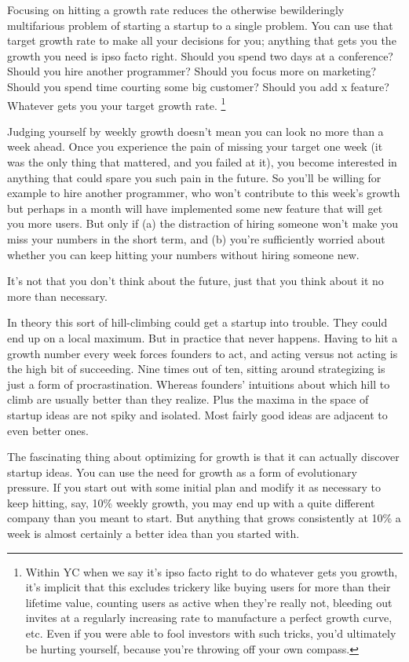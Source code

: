 \documentclass[12pt]{book}
\begin{document}
Focusing on hitting a growth rate reduces the otherwise bewilderingly
multifarious problem of starting a startup to a single problem. You can
use that target growth rate to make all your decisions for you; anything
that gets you the growth you need is ipso facto right. Should you spend
two days at a conference? Should you hire another programmer? Should you
focus more on marketing? Should you spend time courting some big
customer? Should you add x feature? Whatever gets you your target growth
rate. \footnote{Within YC when we say it's ipso facto right to do whatever gets
you growth, it's implicit that this excludes trickery like buying users
for more than their lifetime value, counting users as active when
they're really not, bleeding out invites at a regularly increasing rate
to manufacture a perfect growth curve, etc. Even if you were able to
fool investors with such tricks, you'd ultimately be hurting yourself,
because you're throwing off your own compass.}

Judging yourself by weekly growth doesn't mean you can look no more than
a week ahead. Once you experience the pain of missing your target one
week (it was the only thing that mattered, and you failed at it), you
become interested in anything that could spare you such pain in the
future. So you'll be willing for example to hire another programmer, who
won't contribute to this week's growth but perhaps in a month will have
implemented some new feature that will get you more users. But only if
(a) the distraction of hiring someone won't make you miss your numbers
in the short term, and (b) you're sufficiently worried about whether you
can keep hitting your numbers without hiring someone new.

It's not that you don't think about the future, just that you think
about it no more than necessary.

In theory this sort of hill-climbing could get a startup into trouble.
They could end up on a local maximum. But in practice that never
happens. Having to hit a growth number every week forces founders to
act, and acting versus not acting is the high bit of succeeding. Nine
times out of ten, sitting around strategizing is just a form of
procrastination. Whereas founders' intuitions about which hill to climb
are usually better than they realize. Plus the maxima in the space of
startup ideas are not spiky and isolated. Most fairly good ideas are
adjacent to even better ones.

The fascinating thing about optimizing for growth is that it can
actually discover startup ideas. You can use the need for growth as a
form of evolutionary pressure. If you start out with some initial plan
and modify it as necessary to keep hitting, say, 10\% weekly growth, you
may end up with a quite different company than you meant to start. But
anything that grows consistently at 10\% a week is almost certainly a
better idea than you started with.
\end{document}
